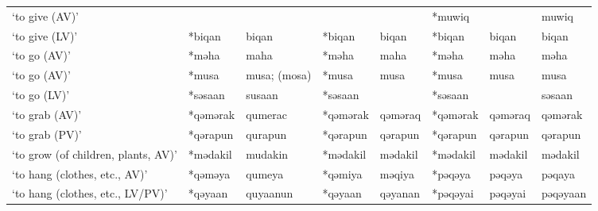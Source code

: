 \begin{landscape}
\begin{longtable}[c]{@{}p{3cm}<{\raggedright}p{2.75cm}<{\raggedright}p{2.75cm}<{\raggedright}p{2.75cm}<{\raggedright}p{2.75cm}<{\raggedright}p{2.75cm}<{\raggedright}p{2.75cm}<{\raggedright}p{2.75cm}<{\raggedright}@{}}
`to give (AV)'                                       &                    &                                &              &                            & *muwiq           &                          & muwiq                             \\
`to give (LV)'                                       & *biqan             & biqan                          & *biqan             & biqan                      & *biqan           & biqan                    & biqan                             \\
`to go (AV)'                                         & *məha              & maha                           & *məha              & maha                       & *məha            & məha                     & məha                              \\
`to go (AV)'                                         & *musa              & musa; (mosa)                   & *musa              & musa                       & *musa            & musa                     & musa                              \\
`to go (LV)'                                         & *səsaan            & susaan                         & *səsaan            &                            & *səsaan          &                          & səsaan                            \\
`to grab (AV)'                                       & *qəmərak           & qumerac                        & *qəmərak           & qəməraq                    & *qəmərak         & qəməraq                  & qəmərak                           \\
`to grab (PV)'                                       & *qərapun           & qurapun                        & *qərapun           & qərapun                    & *qərapun         & qərapun                  & qərapun                           \\
`to grow (of children, plants, AV)'                  & *mədakil           & mudakin                        & *mədakil           & mədakil                    & *mədakil         & mədakil                  & mədakil                           \\
`to hang (clothes, etc., AV)'                        & *qəməya            & qumeya                         & *qəmiya            & məqiya                     & *pəqəya          & pəqəya                   & pəqaya                            \\
`to hang (clothes, etc., LV/PV)'                     & *qəyaan            & quyaanun                       & *qəyaan            & qəyanan                    & *pəqəyai         & pəqəyai                  & pəqəyaan                          \\

\end{longtable}
\end{landscape}
